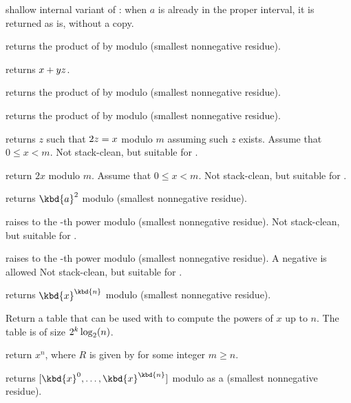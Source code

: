 shallow internal variant of
: when $a$ is already in the
proper interval, it is returned as is, without a copy.

 returns the product of  by
 modulo  (smallest nonnegative residue).

 returns $x + y\*z$.

 returns the product of  by
 modulo  (smallest nonnegative residue).

 returns the product of  by
 modulo  (smallest nonnegative residue).

 returns $z$ such that $2\*z = x$ modulo
$m$ assuming such $z$ exists. Assume that $0 \leq x < m$. Not stack-clean,
but suitable for .

 return $2x$ modulo $m$. Assume that $0
\leq x < m$. Not stack-clean, but suitable for .

 returns $\kbd{a}^2$ modulo  (smallest
nonnegative residue).

 raises  to the -th
power modulo  (smallest nonnegative residue). Not stack-clean, but
suitable for .

 raises  to the -th
power modulo  (smallest nonnegative residue). A negative  is
allowed Not stack-clean, but suitable for .

 returns $\kbd{x}^\kbd{n}$
modulo  (smallest nonnegative residue).

Return a table  that can be used with
 to compute the powers of $x$ up to $n$.
The table is of size $2^k\*\log_2(n)$.

return $x^n$, where $R$ is given by 
for some integer $m\geq n$.

 returns
$[\kbd{x}^0, \dots, \kbd{x}^\kbd{n}]$ modulo  as a 
 (smallest nonnegative residue).

